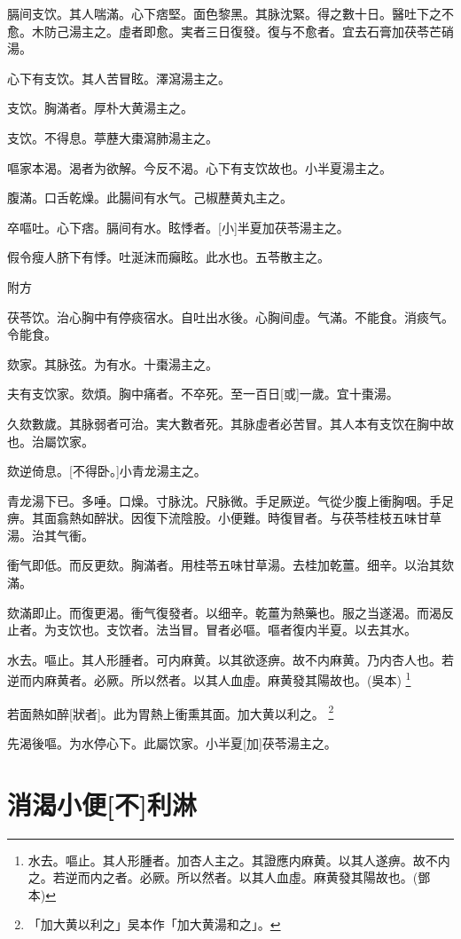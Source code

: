 \documentclass[11pt,oneside,b5paper]{ctexbook}
\begin{document}
\begin{flushleft}
膈间支饮。其人喘滿。心下痞堅。面色黎黑。其脉沈緊。得之數十日。醫吐下之不愈。木防己湯主之。虛者即愈。実者三日復發。復与不愈者。宜去石膏加茯苓芒硝湯。

心下有支饮。其人苦冒眩。澤瀉湯主之。

支饮。胸滿者。厚朴大黄湯主之。

支饮。不得息。葶藶大棗瀉肺湯主之。

嘔家本渴。渴者为欲解。今反不渴。心下有支饮故也。小半夏湯主之。

腹滿。口舌乾燥。此腸间有水气。己椒藶黄丸主之。

卒嘔吐。心下痞。膈间有水。眩悸者。[小]半夏加茯苓湯主之。

假令瘦人脐下有悸。吐涎沫而癲眩。此水也。五苓散主之。

附方

茯苓饮。治心胸中有停痰宿水。自吐出水後。心胸间虛。气滿。不能食。消痰气。令能食。

欬家。其脉弦。为有水。十棗湯主之。

夫有支饮家。欬煩。胸中痛者。不卒死。至一百日[或]一歲。宜十棗湯。

久欬數歲。其脉弱者可治。実大數者死。其脉虛者必苦冒。其人本有支饮在胸中故也。治屬饮家。

欬逆倚息。[不得卧。]小青龙湯主之。

青龙湯下已。多唾。口燥。寸脉沈。尺脉微。手足厥逆。气從少腹上衝胸咽。手足痹。其面翕熱如醉狀。因復下流陰股。小便難。時復冒者。与茯苓桂枝五味甘草湯。治其气衝。

衝气即低。而反更欬。胸滿者。用桂苓五味甘草湯。去桂加乾薑。细辛。以治其欬滿。

欬滿即止。而復更渴。衝气復發者。以细辛。乾薑为熱藥也。服之当遂渴。而渴反止者。为支饮也。支饮者。法当冒。冒者必嘔。嘔者復内半夏。以去其水。

水去。嘔止。其人形腫者。可内麻黄。以其欲逐痹。故不内麻黄。乃内杏人也。若逆而内麻黄者。必厥。所以然者。以其人血虛。麻黄發其陽故也。(吳本)
\footnote{水去。嘔止。其人形腫者。加杏人主之。其證應内麻黄。以其人遂痹。故不内之。若逆而内之者。必厥。所以然者。以其人血虛。麻黄發其陽故也。(鄧本)}

若面熱如醉[狀者]。此为胃熱上衝熏其面。加大黄以利之。
\footnote{「加大黄以利之」吴本作「加大黄湯和之」。}

先渴後嘔。为水停心下。此屬饮家。小半夏[加]茯苓湯主之。

\chapter{消渴小便[不]利淋}


\end{flushleft}
\end{document}
